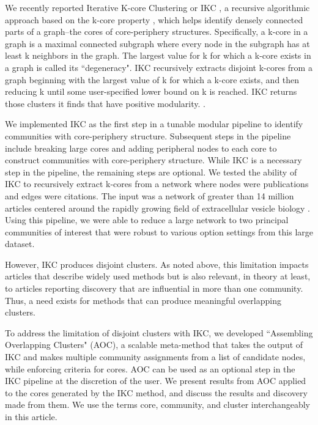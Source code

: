 \documentclass[12pt, oneside]{article}   	%
\begin{document}
We recently reported Iterative K-core Clustering or IKC \citep{Wedell2022}, a recursive algorithmic approach based on the k-core property \citep{Giatsidis2011,malliaros2019}, which helps identify densely connected parts of a graph--the cores of core-periphery structures. Specifically, a k-core in a graph is a maximal connected subgraph where every node in the subgraph has at least k neighbors in the graph.
The largest value for k for which a k-core exists in a graph is called its ``degeneracy". IKC recursively extracts disjoint k-cores from a graph beginning with the largest value of k for which a  k-core  exists, and then reducing k until some user-specified lower bound on k is reached. IKC returns those clusters it finds that have positive modularity.  .

We implemented IKC as the first step in a tunable modular pipeline to identify communities with core-periphery structure. 
Subsequent steps in the pipeline include breaking large cores and adding peripheral nodes to each core to construct communities with core-periphery structure. While IKC is a necessary step in the pipeline, the remaining steps are optional. We tested the ability of IKC to recursively extract k-cores from a network where nodes were publications and edges were citations. 
The input was a network of greater than 14 million articles centered around the rapidly growing field of extracellular vesicle biology \citep{Wedell2022}. Using this pipeline, we were able to reduce a large network to two principal communities of interest that were robust to various option settings \citep[Figure 5]{Wedell2022} from this large dataset.
	
However, IKC produces disjoint clusters. As noted above, this limitation impacts articles that describe widely used methods but is also relevant, in theory at least, to articles reporting discovery that are influential in more than one community.  Thus, a need exists for methods that can produce meaningful overlapping clusters. 
	
To address the limitation of disjoint clusters with IKC, we developed  ``Assembling Overlapping Clusters" (AOC), a scalable meta-method that takes the output of IKC and makes multiple community assignments from a list of candidate nodes, while enforcing criteria for cores. AOC can be used as an optional step in the IKC pipeline at the discretion of the user. We present results from AOC applied to the cores generated by the IKC method, and discuss the results and discovery made from them. We use the terms core, community, and cluster interchangeably in this article.
\end{document}
